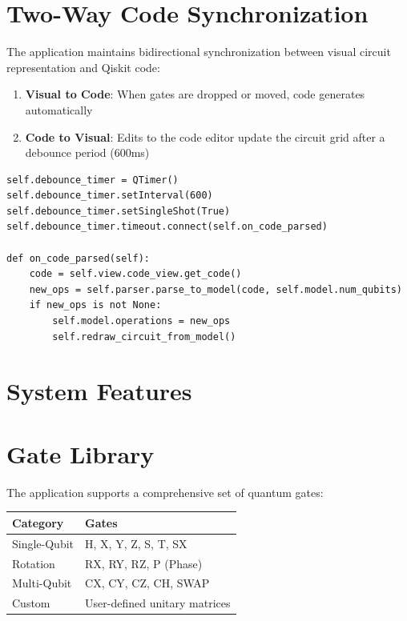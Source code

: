 \documentclass[12pt, a4paper, oneside]{report}
\theoremstyle{plain}
\theoremstyle{definition}
\theoremstyle{remark}
\begin{document}
\section{Two-Way Code Synchronization}
The application maintains bidirectional synchronization between visual circuit representation and Qiskit code:

\begin{enumerate}
	\item \textbf{Visual to Code}: When gates are dropped or moved, code generates automatically
	\item \textbf{Code to Visual}: Edits to the code editor update the circuit grid after a debounce period (600ms)
\end{enumerate}

\begin{listing}[ht]
\begin{verbatim}
self.debounce_timer = QTimer()
self.debounce_timer.setInterval(600)
self.debounce_timer.setSingleShot(True)
self.debounce_timer.timeout.connect(self.on_code_parsed)

def on_code_parsed(self):
    code = self.view.code_view.get_code()
    new_ops = self.parser.parse_to_model(code, self.model.num_qubits)
    if new_ops is not None:
        self.model.operations = new_ops
        self.redraw_circuit_from_model()
\end{verbatim}
\caption{Debounced Code Parsing}
\end{listing}

\section{System Features}

\section{Gate Library}
The application supports a comprehensive set of quantum gates:

\begin{table}[h]
	\centering
	\begin{tabularx}{\linewidth}{lX}
		\toprule
		\textbf{Category} & \textbf{Gates}                \\
		\midrule
		Single-Qubit      & H, X, Y, Z, S, T, SX          \\
		Rotation          & RX, RY, RZ, P (Phase)         \\
		Multi-Qubit       & CX, CY, CZ, CH, SWAP          \\
		Custom            & User-defined unitary matrices \\
		\bottomrule
	\end{tabularx}
\end{table}
\end{document}
